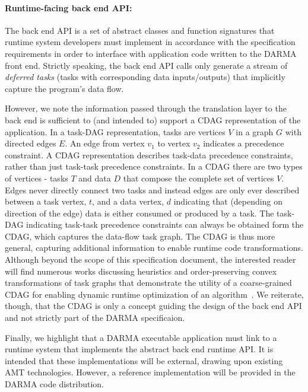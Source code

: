 \paragraph{Runtime-facing back end API:}
The \gls{back end} \gls{API} is a set of abstract classes and function
signatures that \gls{runtime system} developers must implement in accordance with the
specification requirements in order to interface with application code written
to the \gls{DARMA} front end. 
Strictly speaking, the \gls{back end} \gls{API} calls only generate a stream of
\emph{deferred tasks} (tasks with corresponding data inputs/outputs) that
implicitly capture the program's data flow.

However, we note the information passed through the \gls{translation layer} to
the \gls{back end} is sufficient
to (and intended to) support a \gls{CDAG} representation of the application.
In a \gls{task-DAG} representation, tasks are vertices $V$ in a graph $G$ with directed edges $E$.
An edge from vertex $v_1$ to vertex $v_2$ indicates a precedence constraint.
A \gls{CDAG} representation describes task-data precedence constraints, rather
than just task-task precedence constraints.  In a \gls{CDAG} there are two
types of vertices - tasks $T$ and data $D$ that compose the complete set of vertices $V$.
Edges never directly connect two tasks and instead edges are only ever described between a task vertex, $t$, and a data vertex, $d$
indicating that (depending on direction of the edge) data is either consumed or produced by a task.
The \gls{task-DAG} indicating task-task precedence constraints can always be
obtained form the \gls{CDAG}, which captures the data-flow task graph.
The \gls{CDAG} is thus more general, capturing additional information to
enable runtime code transformations.
Although beyond the scope of this specification document, the interested reader
will find numerous works discussing heuristics and order-preserving convex
transformations of task graphs that demonstrate the utility of a coarse-grained
\gls{CDAG} for enabling dynamic runtime optimization of an algorithm~\cite{}.
We reiterate, though, that the \gls{CDAG} is only a concept guiding the design
of the \gls{back end} \gls{API} and not strictly part of the \gls{DARMA} specificaion.


Finally, we highlight that a \gls{DARMA} executable application must link to a \gls{runtime
  system} that implements the abstract \gls{back end} runtime \gls{API}.
It is intended that these implementations will be external, drawing upon
existing AMT technologies.  However,  a reference implementation will be provided
in the \gls{DARMA} code distribution.




